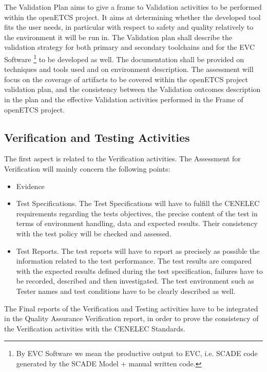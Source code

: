 \documentclass[openetcs]{template/openetcs_article}
\begin{document}
The Validation Plan aims to give a frame to Validation activities to be performed within the openETCS project. It aims at determining whether the developed tool
fits the user needs, in particular with respect to safety and quality relatively to the environment it will be run in.
The Validation plan shall describe the validation strategy for both primary and secondary toolchains and for the EVC Software \footnote{By EVC Software we mean the productive output to EVC, i.e. SCADE code generated by the SCADE Model + manual written code.} to be developed as well. The
documentation shall be provided on techniques and tools used and on environment description. The assessment will focus on the coverage of artifacts to be
covered within the openETCS project validation plan, and the consistency between the Validation outcomes description in the plan and the effective Validation
activities performed in the Frame of openETCS project.

\subsection{Verification and Testing Activities}
The first aspect is related to the Verification activities. The Assessment for Verification will mainly concern the following points:
\begin{itemize}
\item Evidence
\item Test Specifications. The Test Specifications will have to fulfill the CENELEC requirements regarding the tests objectives, the precise content of the test
in terms of environment handling, data and expected results. Their consistency with the test policy will be checked and assessed.
\item Test Reports. The test reports will have to report as precisely as possible the information related to the test performance. The test results are compared
with the expected results defined during the test specification, failures have to be recorded, described and then investigated. The test environment such as
Tester names and test conditions have to be clearly described as well.
\end{itemize}
The Final reports of the Verification and Testing activities have to be integrated in the Quality Assurance Verification report, in order to prove the
consistency of the Verification activities with the CENELEC Standards.
\end{document}
